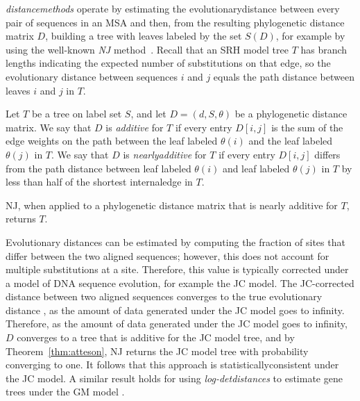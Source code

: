 \textit{\Glspl{distancemethod}} operate by estimating the \gls{evolutionarydistance} between every pair of sequences in an \gls{MSA} and then, from the resulting phylogenetic distance matrix $D$, building a tree with leaves labeled by the set $S(D)$, for example by using the well-known \textit{\gls{NJ}} method~\cite{saitou1987neighbor}.
Recall that an \gls{SRH} model tree $T$ has branch lengths indicating the expected number of substitutions on that edge, so the evolutionary distance between sequences $i$ and $j$ equals the path distance between leaves $i$ and $j$ in $T$.

\begin{definition}
\label{def:nearly-additive}
Let $T$ be a tree on label set $S$, and let $D = (d, S, \theta)$ be a phylogenetic distance matrix.
We say that $D$ is \emph{\gls{additive}} for $T$ if every entry $D[i,j]$ is the sum of the edge weights on the path between the leaf labeled $\theta(i)$ and the leaf labeled $\theta(j)$ in $T$.
We say that $D$ is \emph{\gls{nearlyadditive}} for $T$ if every entry $D[i,j]$ differs from the path distance between leaf labeled $\theta(i)$ and leaf labeled $\theta(j)$ in $T$ by less than half of the shortest \gls{internaledge} in $T$.
\end{definition}

\begin{theorem}
\label{thm:atteson}
NJ, when applied to a phylogenetic distance matrix that is nearly additive for $T$, returns $T$.
\end{theorem}

Evolutionary distances can be estimated by computing the fraction of \glspl{site} that differ between the two aligned sequences; however, this does not account for multiple substitutions at a site.
Therefore, this value is typically corrected under a model of DNA sequence evolution, for example the \gls{JC} model.
The JC-corrected distance between two aligned sequences converges to the true evolutionary distance \cite{warnow2017computational}, as the amount of data generated under the JC model goes to infinity.
Therefore, as the amount of data generated under the JC model goes to infinity, $D$ converges to a tree that is additive for the JC model tree, and by Theorem~\ref{thm:atteson}, NJ returns the JC model tree with probability converging to one.
It follows that this approach is \gls{statisticallyconsistent} under the JC model.
A similar result holds for using \textit{\glspl{log-detdistance}} to estimate gene trees under the \gls{GM} model \cite{steel1994recovering}.

